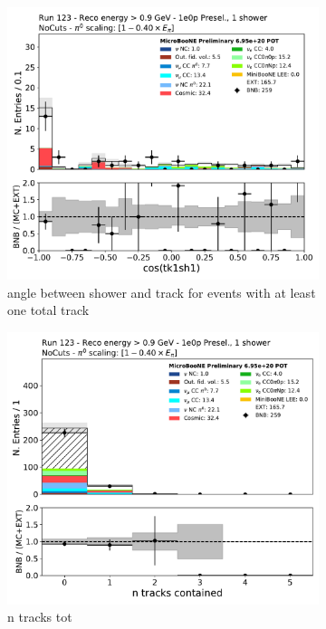 \begin{figure}[H]
    \centering
    \begin{subfigure}{0.3\textwidth}
    \includegraphics[width=1.0\textwidth]{1e0p/High_E_Sideband/tk1sh1_angle_alltk.pdf}
    \caption{angle between shower and track for events with at least one total track}
    \end{subfigure}
    \begin{subfigure}{0.3\textwidth}
    \includegraphics[width=1.0\textwidth]{1e0p/High_E_Sideband/n_tracks_tot.pdf}
    \caption{n tracks tot}
    \end{subfigure}
    \caption{} 
    \label{fig:HE_1eNp_1}
\end{figure}


